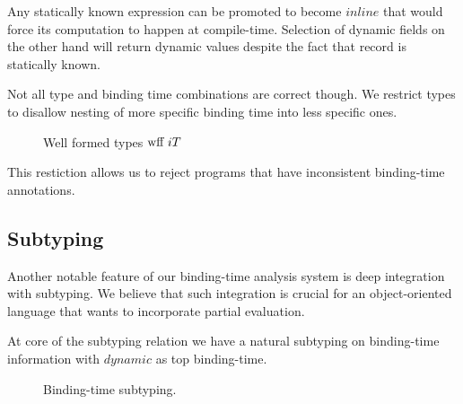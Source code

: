 Any statically known expression can be promoted to become $inline$ that would force its computation
to happen at compile-time. Selection of dynamic fields on the other hand will return dynamic values despite
the fact that record is statically known.

Not all type and binding time combinations are correct though. We restrict types
to disallow nesting of more specific binding time into less specific ones.

\begin{figure}
\begin{multicols}{2}

  {}

  {}

  {}
\end{multicols}
\caption {Well formed types $\text{wff}\ i T$}
\end{figure}

This restiction allows us to reject programs that have inconsistent binding-time annotations.

\subsection{Subtyping}

Another notable feature of our binding-time analysis system is deep integration with subtyping.
We believe that such integration is crucial for an object-oriented language that wants to
incorporate partial evaluation.

At core of the subtyping relation we have a natural subtyping on binding-time information
with $dynamic$ as top binding-time.

\begin{figure}[H]
\begin{multicols}{2}



\end{multicols}
\caption{Binding-time subtyping.}
\end{figure}

